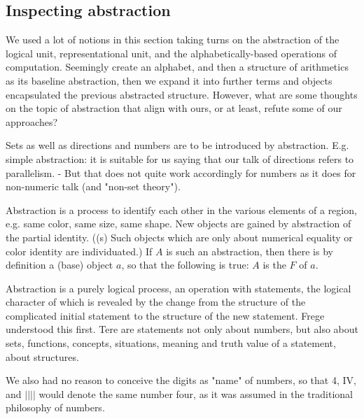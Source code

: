 \subsection{Inspecting abstraction}
We used a lot of notions in this section taking turns on the abstraction of the logical unit, representational unit, and the alphabetically-based operations of computation. Seemingly create an alphabet, and then a structure of arithmetics as its baseline abstraction, then we expand it into further terms and objects encapsulated the previous abstracted structure. However, what are some thoughts on the topic of abstraction that align with ours, or at least, refute some of our approaches?

\begin{displayquote}
    Sets as well as directions and numbers are to be introduced by abstraction. E.g. simple abstraction: it is suitable for us saying that our talk of directions refers to parallelism. - But that does not quite work accordingly for numbers as it does for non-numeric talk (and "non-set theory").
\end{displayquote}

\begin{displayquote}
    Abstraction is a process to identify each other in the various elements of a region, e.g. same color, same size, same shape. New objects are gained by abstraction of the partial identity. ((s) Such objects which are only about numerical equality or color identity are individuated.) If $A$ is such an abstraction, then there is by definition a (base) object $a$, so that the following is true: $A$ is the $F$ of $a$.
\end{displayquote}

\begin{displayquote}[Thiel]
    Abstraction is a purely logical process, an operation with statements, the logical character of which is revealed by the change from the structure of the complicated initial statement to the structure of the new statement. Frege understood this first. Tere are statements not only about numbers, but also about sets, functions, concepts, situations, meaning and truth value of a statement, about structures.

    We also had no reason to conceive the digits as "name" of numbers, so that 4, IV, and $||||$ would denote the same number four, as it was assumed in the traditional philosophy of numbers. 
\end{displayquote}

